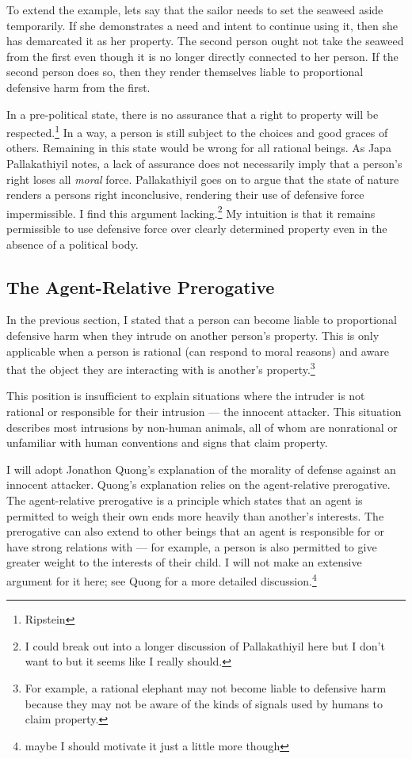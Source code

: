 \documentclass[12pt]{book}
\begin{document}
	To extend the example, lets say that the sailor needs to set the seaweed
	aside temporarily. If she demonstrates a need and intent to continue using
	it, then she has demarcated it as her property. The second person ought not
	take the seaweed from the first even though it is no longer directly
	connected to her person. If the second person does so, then they render
	themselves liable to proportional defensive harm from the first.

	In a pre-political state, there is no assurance that a right to property
	will be respected.\footnote{Ripstein} In a way, a person is still subject
	to the choices and good graces of others. Remaining in this state would be
	wrong for all rational beings. As Japa Pallakathiyil notes, a lack of
	assurance does not necessarily imply that a person’s right loses all
	\emph{moral} force. Pallakathiyil goes on to argue that the state of nature
	renders a persons right inconclusive, rendering their use of defensive
	force impermissible. I find this argument lacking.\footnote{I could break
	out into a longer discussion of Pallakathiyil here but I don’t want to but
	it seems like I really should.} My intuition is that it remains permissible
	to use defensive force over clearly determined property even in the absence
	of a political body.

	\subsection{The Agent-Relative Prerogative}

	In the previous section, I stated that a person can become liable to
	proportional defensive harm when they intrude on another person’s property.
	This is only applicable when a person is rational (can respond to moral
	reasons) and aware that the object they are interacting with is another’s
	property.\footnote{For example, a rational elephant may not become liable
	to defensive harm because they may not be aware of the kinds of signals
	used by humans to claim property.}

	This position is insufficient to explain situations where the intruder is
	not rational or responsible for their intrusion --- the innocent attacker.
	This situation describes most intrusions by non-human animals, all of whom
	are nonrational or unfamiliar with human conventions and signs that claim
	property.

	I will adopt Jonathon Quong’s explanation of the morality of defense against
	an innocent attacker. Quong’s explanation relies on the agent-relative
	prerogative. The agent-relative prerogative is a principle which states that
	an agent is permitted to weigh their own ends more heavily than another’s
	interests. The prerogative can also extend to other beings that an agent is
	responsible for or have strong relations with --- for example, a person is
	also permitted to give greater weight to the interests of their child. I
	will not make an extensive argument for it here; see Quong for a more
	detailed discussion.\footnote{maybe I should motivate it just a little more
	though}
\end{document}
